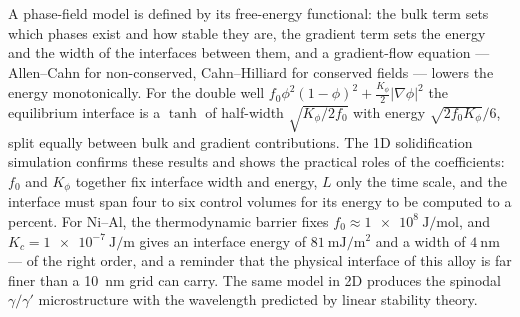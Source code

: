 \documentclass[11pt,a4paper]{article}
\numberwithin{equation}{section}
\theoremstyle{remark}
\begin{document}
A phase-field model is defined by its free-energy functional: the bulk term sets which phases exist and
how stable they are, the gradient term sets the energy and the width of the interfaces between them, and
a gradient-flow equation --- Allen--Cahn for non-conserved, Cahn--Hilliard for conserved fields ---
lowers the energy monotonically. For the double well
$f_0\phi^2(1-\phi)^2 + \tfrac{K_\phi}{2}|\nabla\phi|^2$ the equilibrium interface is a $\tanh$ of
half-width $\sqrt{K_\phi/2f_0}$ with energy $\sqrt{2f_0K_\phi}/6$, split equally between bulk and
gradient contributions. The 1D solidification simulation confirms these results and shows the practical
roles of the coefficients: $f_0$ and $K_\phi$ together fix interface width and energy, $L$ only the time
scale, and the interface must span four to six control volumes for its energy to be computed to a
percent. For Ni--Al, the thermodynamic barrier fixes $f_0\approx\SI{1e8}{\joule\per\mole}$, and
$K_c = \SI{1e-7}{\joule\per\metre}$ gives an interface energy of $\SI{81}{\milli\joule\per\metre\squared}$
and a width of $\SI{4}{\nano\metre}$ --- of the right order, and a reminder that the physical interface
of this alloy is far finer than a \SI{10}{\nano\metre} grid can carry. The same model in 2D produces the
spinodal $\gamma/\gamma'$ microstructure with the wavelength predicted by linear stability theory.
\end{document}
